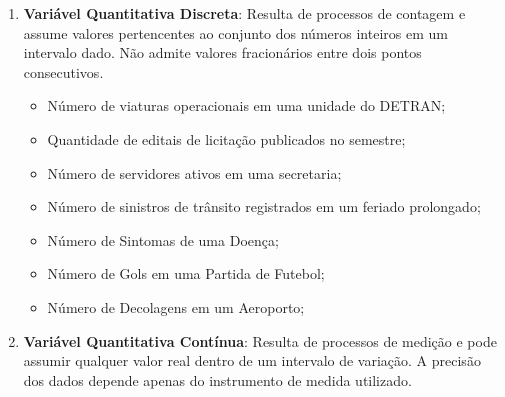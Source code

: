 \begin{enumerate}
\vskip0.3cm

\begin{tcolorbox}[colback=green!5,colframe=green!40!black,title= Dica para a Tomada de Decisão]
Ao analisar variáveis ordinais, como o \textbf{Nível de Satisfação}, lembre-se de que a diferença entre "Satisfeito" e "Muito Satisfeito" não é necessariamente a mesma que entre "Insatisfeito" e "Muito Insatisfeito". Por isso, a média muitas vezes não é a medida mais adequada, sendo preferível o uso da \textbf{Mediana} para representar a tendência central do indicador.
\end{tcolorbox}



\subsubsection{Variáveis Quantitativas ou Numéricas}

são aquelas cujos valores são expressos numericamente, permitindo operações aritméticas e mensuração de grandezas. Elas são fundamentais para a construção de indicadores de eficiência e eficácia no setor público.



  \item \textbf{Variável Quantitativa Discreta}: Resulta de processos de contagem e assume valores pertencentes ao conjunto dos números inteiros em um intervalo dado. Não admite valores fracionários entre dois pontos consecutivos.

\begin{itemize}
\item Número de viaturas operacionais em uma unidade do DETRAN;
\item Quantidade de editais de licitação publicados no semestre;
\item Número de servidores ativos em uma secretaria;
\item Número de sinistros de trânsito registrados em um feriado prolongado;
\item Número de Sintomas de uma Doença;
\item Número de Gols em uma Partida de Futebol;
\item Número de Decolagens em um Aeroporto;
\end{itemize}

\newpage
  \item \textbf{Variável Quantitativa Contínua}: Resulta de processos de medição e pode assumir qualquer valor real dentro de um intervalo de variação. A precisão dos dados depende apenas do instrumento de medida utilizado.
  

\end{enumerate}
